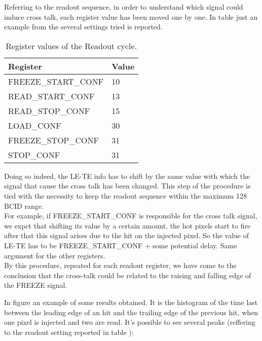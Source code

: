 Referring to the readout sequence, in order to understand which signal could induce cross talk, each register value has been moved one by one.
In table  just an example from the several settings tried is reported.

\begin{table}[h!]
\centering
\begin{tabular}{>{} C{5cm}|C{1.7cm}}
Register & Value \\
\hline
\textsc{FREEZE\_START\_CONF} & 10\\[0.3ex]
\hline
\textsc{READ\_START\_CONF}& 13 \\[0.3ex]
\hline
\textsc{READ\_STOP\_CONF} & 15 \\[0.3ex]
\hline
\textsc{LOAD\_CONF} & 30 \\[0.3ex]
\hline
\textsc{FREEZE\_STOP\_CONF} & 31\\[0.3ex]
\hline
\textsc{STOP\_CONF} & 31\\[0.3ex]
\hline
\end{tabular}
\caption{Register values of the Readout cycle.}
\label{tab:ro_registers}
\end{table}

Doing so indeed, the LE-TE info has to shift by the same value with which the signal that cause the cross talk has been changed. This step of the procedure is tied with the necessity to keep the readout sequence within the maximum 128 BCID range.\\

For example, if \textsc{FREEZE\_START\_CONF} is responsible for the cross talk signal, we expct that shifting its value by a certain amount, the hot pixels start to fire after that this signal arises due to the hit on the injected pixel. So the value of LE-TE has to be \textsc{FREEZE\_START\_CONF} + some potential delay. Same argument for the other registers. \\

By this procedure, repeated for each readout register, we have come to the conclusion that the cross-talk could be related to the raising and falling edge of the \textsc{FREEZE} signal.

In figure  an example of some results obtained. It is the histogram of the time last between the leading edge of an hit and the trailing edge of the previous hit, when one pixel is injected and two are read. It's possible to see several peaks (reffering to the readout setting reported in table ):

